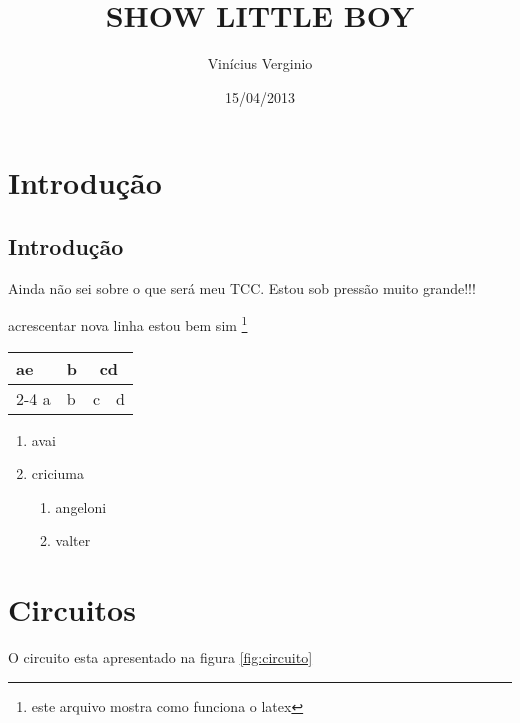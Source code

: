\documentclass{report}
\author{Vinícius Verginio}
\date{15/04/2013}
\title{SHOW LITTLE BOY}
\begin{document}
\maketitle

\newpage
\chapter{Introdução}
\section{Introdução}
\label{sec:intro} %
Ainda não sei sobre o que será meu TCC. Estou sob pressão muito grande!!! %

acrescentar nova linha
\hfill estou bem sim %
\footnote{este arquivo mostra como funciona o latex} %

\begin{table}
\begin{tabular}{|l|l|l|r|} %
\multirow{2}{*}{ae}
	a & b & \multicolumn{2}{c}{cd} \\
	\cline{2-4}
	a & b & c & d \\ 
	
\end{tabular}
\end{table}




\begin{enumerate}
	\item avai
	\item criciuma
		\begin{enumerate}[label*=\arabic*.]
		\item angeloni
		\item valter		
		\end{enumerate}
\end{enumerate}

\chapter{Circuitos}
\label{sec:circuito}
O circuito esta apresentado na figura \ref{fig:circuito} %
\end{document}
